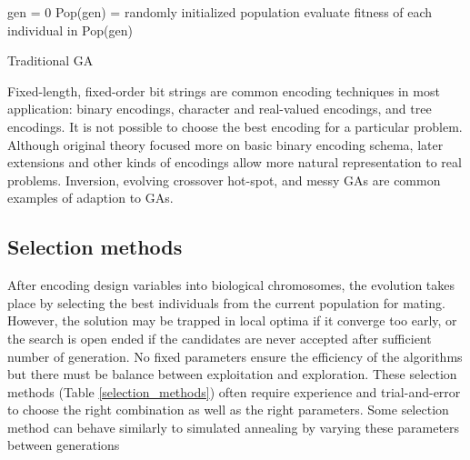 \bigskip
\begin{algorithm}[h]
 \SetAlgoLined
 gen = 0 \;
 Pop(gen) = randomly initialized population \;
 evaluate fitness of each individual in Pop(gen) \;
 \caption{Traditional GA}
 \label{alg:ga}
\end{algorithm}

Fixed-length, fixed-order bit strings are common encoding techniques in most application: binary encodings, character and real-valued encodings, and tree encodings. It is not possible to choose the best encoding for a particular problem. Although original theory focused more on basic binary encoding schema, later extensions and other kinds of encodings allow more natural representation to real problems. Inversion, evolving crossover hot-spot, and messy GAs are common examples of adaption to GAs.

\subsection*{Selection methods}

After encoding design variables into biological chromosomes, the evolution takes place by selecting the best individuals from the current population for mating. However, the solution may be trapped in local optima if it converge too early, or the search is open ended if the candidates are never accepted after sufficient number of generation. No fixed parameters ensure the efficiency of the algorithms but there must be balance between exploitation and exploration. These selection methods (Table \ref{selection_methods}) often require experience and trial-and-error to choose the right combination as well as the right parameters. Some selection method can behave similarly to simulated annealing by varying these parameters between generations

